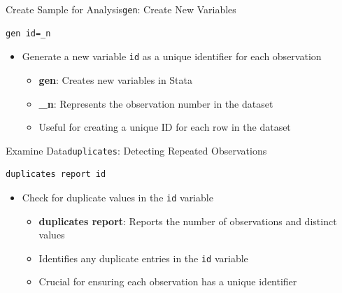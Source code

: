 \documentclass[hyperref={pdfpagelabels=false}]{beamer}
\begin{document}
\begin{frame}[fragile]{Create Sample for Analysis}{\texttt{gen}: Create New Variables}
\begin{lstlisting}
gen id=_n
\end{lstlisting}
\begin{itemize}
	\vspace{0.2cm}
	\item Generate a new variable \texttt{id} as a unique identifier for each observation
	\vspace{0.2cm}
	\begin{itemize}
		\item \textbf{gen}: Creates new variables in Stata
		\vspace{0.2cm}
		\item \textbf{\_n}: Represents the observation number in the dataset
		\vspace{0.2cm}
		\item Useful for creating a unique ID for each row in the dataset
	\end{itemize}
\end{itemize}
\end{frame}



\begin{frame}[fragile]{Examine Data}{\texttt{duplicates}: Detecting Repeated Observations}
\begin{lstlisting}
duplicates report id
\end{lstlisting}
\begin{itemize}
	\vspace{0.2cm}
	\item Check for duplicate values in the \texttt{id} variable
	\vspace{0.2cm}
	\begin{itemize}
		\item \textbf{duplicates report}: Reports the number of observations and distinct values
		\vspace{0.2cm}
		\item Identifies any duplicate entries in the \texttt{id} variable
		\vspace{0.2cm}
		\item Crucial for ensuring each observation has a unique identifier
	\end{itemize}
\end{itemize}
\end{frame}
\end{document}
